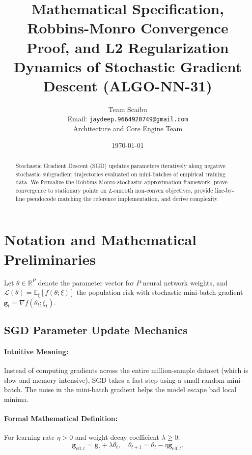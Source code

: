 \documentclass[11pt]{article}
\title{\textbf{Mathematical Specification, Robbins-Monro Convergence Proof, and L2 Regularization Dynamics of Stochastic Gradient Descent (ALGO-NN-31)}}
\author{Team Scaibu \\ \small Email: \texttt{jaydeep.9664920749@gmail.com} \\ \small Architecture and Core Engine Team}
\date{\today}
\begin{document}
\maketitle

\begin{abstract}
Stochastic Gradient Descent (SGD) updates parameters iteratively along negative stochastic subgradient trajectories evaluated on mini-batches of empirical training data. We formalize the Robbins-Monro stochastic approximation framework, prove convergence to stationary points on $L$-smooth non-convex objectives, provide line-by-line pseudocode matching the reference implementation, and derive complexity.
\end{abstract}

\section{Notation and Mathematical Preliminaries}
\label{sec:notation}

Let $\theta \in \mathbb{R}^P$ denote the parameter vector for $P$ neural network weights, and $\mathcal{L}(\theta) = \mathbb{E}_{\xi}[f(\theta; \xi)]$ the population risk with stochastic mini-batch gradient $\mathbf{g}_t = \nabla f(\theta_t; \xi_t)$.

\subsection{SGD Parameter Update Mechanics}
\paragraph{Intuitive Meaning:} Instead of computing gradients across the entire million-sample dataset (which is slow and memory-intensive), SGD takes a fast step using a small random mini-batch. The noise in the mini-batch gradient helps the model escape bad local minima.

\paragraph{Formal Mathematical Definition:}
For learning rate $\eta > 0$ and weight decay coefficient $\lambda \ge 0$:
\begin{equation}
\label{eq:sgd_update}
\mathbf{g}_{\mathrm{eff}, t} = \mathbf{g}_t + \lambda \theta_t, \quad \theta_{t+1} = \theta_t - \eta \mathbf{g}_{\mathrm{eff}, t}.
\end{equation}
\end{document}
